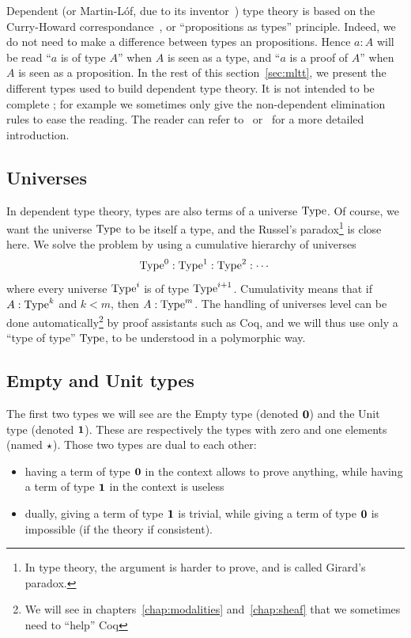 Dependent (or Martin-L\'of, due to its inventor~\cite{mltt}) type
theory is based on the Curry-Howard correspondance~\cite{Howard80}, or
``propositions as types'' principle. Indeed, we do not need to make a
difference between types an propositions. Hence $a:A$ will be read
``$a$ is of type $A$'' when $A$ is seen as a type, and ``$a$ is a
proof of $A$'' when $A$ is seen as a proposition. In the rest of this
section~\ref{sec:mltt}, we present the different types used to build
dependent type theory. It is not intended to be complete ; for example
we sometimes only give the non-dependent elimination rules to ease the
reading. The reader
can refer to~\cite{nordstrom2001martin} or~\cite{hottbook} for a more
detailed introduction.


\subsection{Universes}
\label{ssec:universes}
In dependent type theory, types are also terms of a universe
$\operatorname{Type}$. Of course, we want the universe $\operatorname{Type}$ to be itself a type,
and the Russel's paradox\footnote{In type theory, the argument is
  harder to prove, and is called Girard's paradox.} is close here.
We solve the problem by using a cumulative hierarchy of universes
\[ \operatorname{Type}^0 : \operatorname{Type}^1 : \operatorname{Type}^2 :\cdots \]
where every universe $\operatorname{Type}^i$ is of type $\operatorname{Type}^{i+1}$. Cumulativity means
that if $A:\operatorname{Type}^k$ and $k<m$, then $A:\operatorname{Type}^m$. The handling of
universes level can be done automatically\footnote{We will see in
  chapters~\ref{chap:modalities} and~\ref{chap:sheaf} that we
  sometimes need to ``help'' Coq}
 by proof assistants such as Coq,
and we will thus use only a ``type of type'' $\operatorname{Type}$, to be understood
in a polymorphic way.

\subsection{Empty and Unit types}
\label{ssec:unit_empty}

The first two types we will see are the Empty type (denoted
$\mathbf{0}$) and the Unit type (denoted
$\mathbf{1}$).
These are respectively the types with zero and one elements (named $\star$). Those two
types are dual to each other:
\begin{itemize}
\item having a term of type $\mathbf{0}$ in the context allows to prove
  anything, while having a term of type $\mathbf{1}$ in the context is
  useless
\item dually, giving a term of type $\mathbf{1}$ is trivial, while giving a
  term of type $\mathbf{0}$ is impossible (if the theory if consistent).
\end{itemize}

